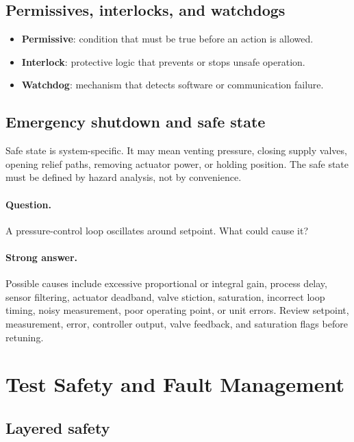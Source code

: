 \documentclass[11pt]{article}
\newcommand{\question}[1]{\paragraph{Question.} #1}
\newcommand{\stronganswer}[1]{\paragraph{Strong answer.} #1}
\begin{document}
\subsection{Permissives, interlocks, and watchdogs}
\begin{itemize}
  \item \textbf{Permissive}: condition that must be true before an action is allowed.
  \item \textbf{Interlock}: protective logic that prevents or stops unsafe operation.
  \item \textbf{Watchdog}: mechanism that detects software or communication failure.
\end{itemize}

\subsection{Emergency shutdown and safe state}
Safe state is system-specific. It may mean venting pressure, closing supply
valves, opening relief paths, removing actuator power, or holding position. The
safe state must be defined by hazard analysis, not by convenience.

\question{A pressure-control loop oscillates around setpoint. What could cause it?}
\stronganswer{Possible causes include excessive proportional or integral gain,
process delay, sensor filtering, actuator deadband, valve stiction, saturation,
incorrect loop timing, noisy measurement, poor operating point, or unit errors.
Review setpoint, measurement, error, controller output, valve feedback, and
saturation flags before retuning.}

\section{Test Safety and Fault Management}

\subsection{Layered safety}
\begin{center}
\end{center}
\end{document}
